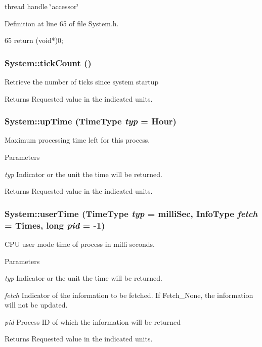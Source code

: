 thread handle \char`\"{}accessor\char`\"{} 

Definition at line 65 of file System.h.


\begin{DoxyCode}
65 { return (void*)0; }
\end{DoxyCode}
\hypertarget{namespaceSystem_ad25a2f7dd8fd06ea18ea328a7bd26e79}{
\subsubsection[{tickCount}]{ System::tickCount ()}}
\label{namespaceSystem_ad25a2f7dd8fd06ea18ea328a7bd26e79}
Retrieve the number of ticks since system startup \begin{DoxyReturn}{Returns}
Requested value in the indicated units. 
\end{DoxyReturn}
\hypertarget{namespaceSystem_a96965372858744c96c7cdf155693d8a0}{
\subsubsection[{upTime}]{ System::upTime (TimeType {\em typ} = {\ttfamily Hour})}}
\label{namespaceSystem_a96965372858744c96c7cdf155693d8a0}
Maximum processing time left for this process. 
\begin{DoxyParams}{Parameters}
\item[{\em typ}]Indicator or the unit the time will be returned. \end{DoxyParams}
\begin{DoxyReturn}{Returns}
Requested value in the indicated units. 
\end{DoxyReturn}
\hypertarget{namespaceSystem_a8a8a351f0cd9f68163ff6b520cde55c1}{
\subsubsection[{userTime}]{ System::userTime (TimeType {\em typ} = {\ttfamily milliSec}, \/  InfoType {\em fetch} = {\ttfamily Times}, \/  long {\em pid} = {\ttfamily -\/1})}}
\label{namespaceSystem_a8a8a351f0cd9f68163ff6b520cde55c1}
CPU user mode time of process in milli seconds. 
\begin{DoxyParams}{Parameters}
\item[{\em typ}]Indicator or the unit the time will be returned. \item[{\em fetch}]Indicator of the information to be fetched. If Fetch\_\-None, the information will not be updated. \item[{\em pid}]Process ID of which the information will be returned \end{DoxyParams}
\begin{DoxyReturn}{Returns}
Requested value in the indicated units. 
\end{DoxyReturn}
